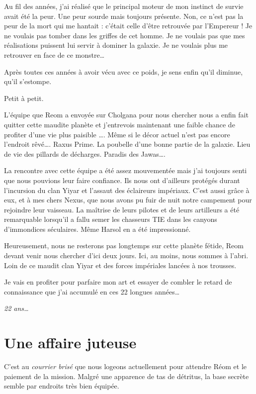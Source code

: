 \documentclass[a4paper,9pt,twoside,twocolumn,openany]{book}
\begin{document}
Au fil des années, j’ai réalisé que le principal moteur de mon instinct de survie avait été la peur. Une peur sourde mais toujours présente. Non, ce n’est pas la peur de la mort qui me hantait : c’était celle d’être retrouvée par l’Empereur ! Je ne voulais pas tomber dans les griffes de cet homme. Je ne voulais pas que mes réalisations puissent lui servir à dominer la galaxie. Je ne voulais plus me retrouver en face de ce monstre…

Après toutes ces années à avoir vécu avec ce poids, je sens enfin qu’il diminue, qu’il s’estompe. 

Petit à petit.

L’équipe que Reom a envoyée sur Cholgana pour nous chercher nous a enfin fait quitter cette maudite planète et j’entrevois maintenant une faible chance de profiter d’une vie plus paisible …. Même si le décor actuel n’est pas encore l’endroit rêvé…. Raxus Prime. La poubelle d’une bonne partie de la galaxie. Lieu de vie des pillards de décharges. Paradis des Jawas….

La rencontre avec cette équipe a été assez mouvementée mais j’ai toujours senti que nous pouvions leur faire confiance. Ils nous ont d’ailleurs protégés durant l’incursion du clan Yiyar et l’assaut des éclaireurs impériaux. C’est aussi grâce à eux, et à mes chers Nexus, que nous avons pu fuir de nuit notre campement pour rejoindre leur vaisseau. La maîtrise de leurs pilotes et de leurs artilleurs a été remarquable lorsqu’il a fallu semer les chasseurs TIE dans les canyons d’immondices séculaires. Même Harsol en a été impressionné.

Heureusement, nous ne resterons pas longtemps sur cette planète fétide, Reom devant venir nous chercher d’ici deux jours. Ici, au moins, nous sommes à l’abri. Loin de ce maudit clan Yiyar et des forces impériales lancées à nos trousses.

Je vais en profiter pour parfaire mon art et essayer de combler le retard de connaissance que j’ai accumulé en ces 22 longues années…

\emph{22 ans…}

\section{Une affaire juteuse}
\subtitle{30 septembre 2017}

C’est au \emph{courrier brisé} que nous logeons actuellement pour attendre Réom et le paiement de la mission. Malgré une apparence de tas de détritus, la base secrète semble par endroits très bien équipée.
\end{document}
